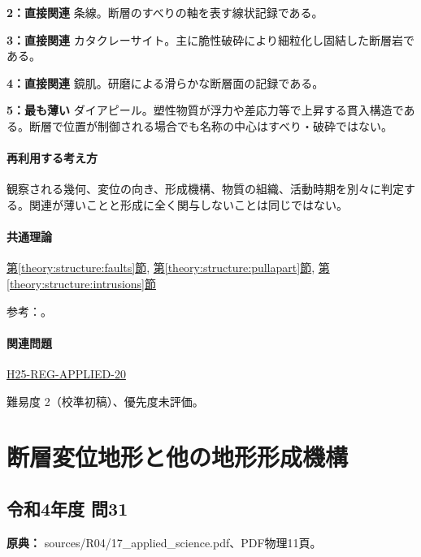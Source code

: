 \noindent\textbf{2：直接関連} 条線。断層のすべりの軸を表す線状記録である。\par

\noindent\textbf{3：直接関連} カタクレーサイト。主に脆性破砕により細粒化し固結した断層岩である。\par

\noindent\textbf{4：直接関連} 鏡肌。研磨による滑らかな断層面の記録である。\par

\noindent\textbf{5：最も薄い} ダイアピール。塑性物質が浮力や差応力等で上昇する貫入構造である。断層で位置が制御される場合でも名称の中心はすべり・破砕ではない。\par

\paragraph{再利用する考え方} 観察される幾何、変位の向き、形成機構、物質の組織、活動時期を別々に判定する。関連が薄いことと形成に全く関与しないことは同じではない。

\paragraph{共通理論} \hyperref[theory:structure:faults]{第\ref*{theory:structure:faults}節}, \hyperref[theory:structure:pullapart]{第\ref*{theory:structure:pullapart}節}, \hyperref[theory:structure:intrusions]{第\ref*{theory:structure:intrusions}節}

\par 参考：\cite{str_faultrocks,str_diapir}。

\paragraph{関連問題} \hyperref[q:h25-reg-applied-20]{H25-REG-APPLIED-20}

\par 難易度 2（校準初稿）、優先度未評価。

\section{断層変位地形と他の地形形成機構}

\subsection{令和4年度 問31}
\label{q:r04-reg-applied-31}

\noindent\textbf{原典：} sources/R04/17\_applied\_science.pdf、PDF物理11頁。


